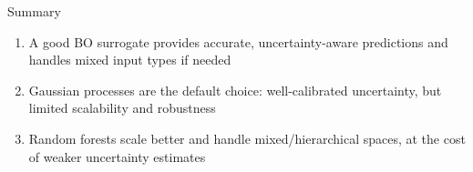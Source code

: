 \documentclass[main]{subfiles}
\begin{document}

\begin{frame}{Summary}
\begin{enumerate}
    \item A good BO surrogate provides accurate, uncertainty-aware predictions and handles mixed input types if needed
    \item Gaussian processes are the default choice: well-calibrated uncertainty, but limited scalability and robustness
    \item Random forests scale better and handle mixed/hierarchical spaces, at the cost of weaker uncertainty estimates
\end{enumerate}
\end{frame}
\end{document}
